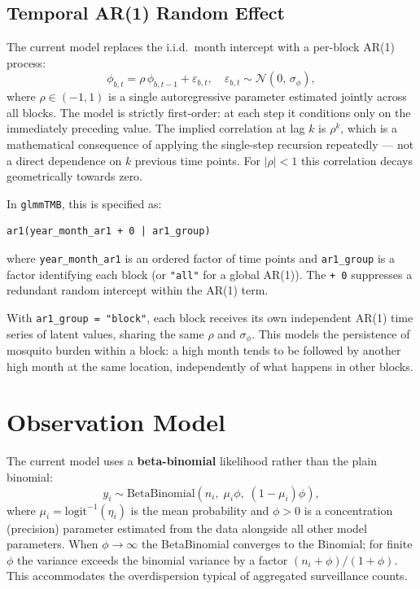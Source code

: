 \documentclass[12pt,a4paper]{article}
\begin{document}
\subsection{Temporal AR(1) Random Effect}
\label{sec:ar1}

The current model replaces the i.i.d.\ month intercept with a per-block AR(1) process:
\begin{equation}
\phi_{b,t} = \rho\, \phi_{b,t-1} + \varepsilon_{b,t}, \quad \varepsilon_{b,t} \sim \mathcal{N}(0,\, \sigma_\phi),
\end{equation}
where $\rho \in (-1, 1)$ is a single autoregressive parameter estimated jointly across all blocks. The model is strictly first-order: at each step it conditions only on the immediately preceding value. The implied correlation at lag $k$ is $\rho^k$, which is a mathematical consequence of applying the single-step recursion repeatedly — not a direct dependence on $k$ previous time points. For $|\rho| < 1$ this correlation decays geometrically towards zero.

In \texttt{glmmTMB}, this is specified as:
\begin{verbatim}
ar1(year_month_ar1 + 0 | ar1_group)
\end{verbatim}
where \texttt{year\_month\_ar1} is an ordered factor of time points and \texttt{ar1\_group} is a factor identifying each block (or \texttt{"all"} for a global AR(1)). The \texttt{+ 0} suppresses a redundant random intercept within the AR(1) term.

With \texttt{ar1\_group = "block"}, each block receives its own independent AR(1) time series of latent values, sharing the same $\rho$ and $\sigma_\phi$. This models the persistence of mosquito burden within a block: a high month tends to be followed by another high month at the same location, independently of what happens in other blocks.

\section{Observation Model}

The current model uses a \textbf{beta-binomial} likelihood rather than the plain binomial:
\begin{equation}
y_i \sim \text{BetaBinomial}(n_i,\; \mu_i \phi,\; (1 - \mu_i) \phi),
\end{equation}
where $\mu_i = \text{logit}^{-1}(\eta_i)$ is the mean probability and $\phi > 0$ is a concentration (precision) parameter estimated from the data alongside all other model parameters. When $\phi \to \infty$ the BetaBinomial converges to the Binomial; for finite $\phi$ the variance exceeds the binomial variance by a factor $(n_i + \phi)/(1 + \phi)$. This accommodates the overdispersion typical of aggregated surveillance counts.
\end{document}
